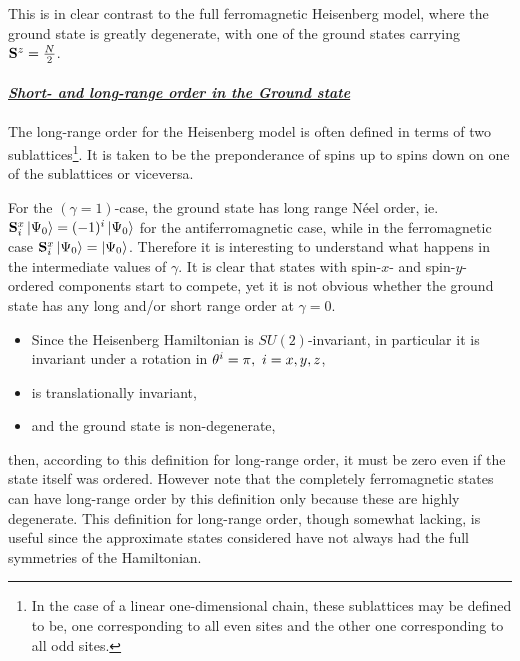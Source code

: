 \documentclass{homework}
\begin{document}
This is in clear contrast to the full ferromagnetic Heisenberg model, where the ground state is greatly degenerate, with one of the ground states carrying ${\bf S}^z = \frac{N}{2}$. \\

\paragraph{\textit{\underline{Short- and long-range order in the Ground state}}} 

The long-range order for the Heisenberg model is often defined in terms of two sublattices\footnote{In the case of a linear one-dimensional chain, these sublattices may be defined to be, one corresponding to all even sites and the other one corresponding to all odd sites.}. It is taken to be the preponderance of spins up to spins down on one of the sublattices or viceversa.

\begin{tcolorbox}[colback = yellow, title = Physical Context]

For the $(\gamma=1)$-case, the ground state has long range Néel order, ie. ${\bf S}^x_i \ket{\Psi_0} = (-1)^i \ket{\Psi_0}$ for the antiferromagnetic case, while in the ferromagnetic case ${\bf S}^x_i \ket{\Psi_0} = \ket{\Psi_0}$. Therefore it is interesting to understand what happens in the intermediate values of $\gamma$. It is clear that states with spin-$x$- and spin-$y$-ordered components start to compete, yet it is not obvious whether the ground state has any long and/or short range order at $\gamma = 0$.

\end{tcolorbox}

\begin{itemize}
    \item Since the Heisenberg Hamiltonian is $SU(2)$-invariant, in particular it is invariant under a rotation in $\theta^{i} = \pi, \textnormal{ } i =x,y,z$,
    \item is translationally invariant,
    \item and the ground state is non-degenerate,
\end{itemize}

then, according to this definition for long-range order, it must be zero even if the state itself was ordered. However note that the completely ferromagnetic states can have long-range order by this definition only because these are highly degenerate. This definition for long-range order, though somewhat lacking, is useful since the approximate states considered have not always had the full symmetries of the Hamiltonian.\\
\end{document}
